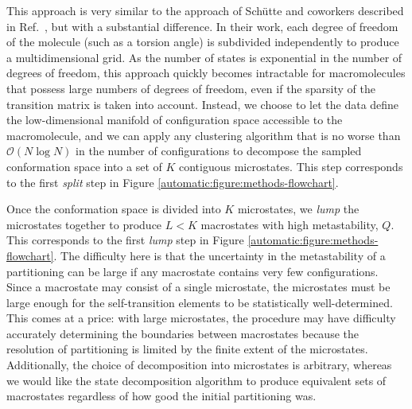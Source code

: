 This approach is very similar to the approach of Sch\"{u}tte and coworkers described in Ref.\ \cite{schuette:1999a}, but with a substantial difference.
In their work, each degree of freedom of the molecule (such as a torsion angle) is subdivided independently to produce a multidimensional grid.
As the number of states is exponential in the number of degrees of freedom, this approach quickly becomes intractable for macromolecules that possess large numbers of degrees of freedom, even if the sparsity of the transition matrix is taken into account.
Instead, we choose to let the data define the low-dimensional manifold of configuration space accessible to the macromolecule, and we can apply any clustering algorithm that is no worse than $\mathcal{O}(N \log N)$ in the number of configurations to decompose the sampled conformation space into a set of $K$ contiguous microstates.
This step corresponds to the first \emph{split} step in Figure \ref{automatic:figure:methods-flowchart}.

Once the conformation space is divided into $K$ microstates, we \emph{lump} the microstates together to produce $L < K$ macrostates with high metastability, $Q$.
This corresponds to the first \emph{lump} step in Figure \ref{automatic:figure:methods-flowchart}.  
The difficulty here is that the uncertainty in the metastability of a partitioning can be large if any macrostate contains very few configurations.
Since a macrostate may consist of a single microstate, the microstates must be large enough for the self-transition elements to be statistically well-determined.
This comes at a price: with large microstates, the procedure may have difficulty accurately determining the boundaries between macrostates because the resolution of partitioning is limited by the finite extent of the microstates.
Additionally, the choice of decomposition into microstates is arbitrary, whereas we would like the state decomposition algorithm to produce equivalent sets of macrostates regardless of how good the initial partitioning was.

